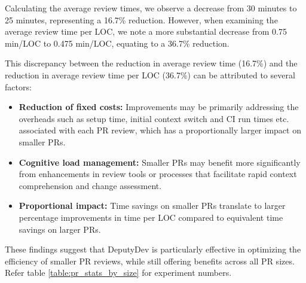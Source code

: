 Calculating the average review times, we observe a decrease from 30 minutes to 25 minutes, representing a 16.7\% reduction. However, when examining the average review time per LOC, we note a more substantial decrease from 0.75 min/LOC to 0.475 min/LOC, equating to a 36.7\% reduction.

This discrepancy between the reduction in average review time (16.7\%) and the reduction in average review time per LOC (36.7\%) can be attributed to several factors:

\begin{itemize}
    \item \textbf{Reduction of fixed costs:} Improvements may be primarily addressing the overheads such as setup time, initial context switch and CI run times etc. associated with each PR review, which has a proportionally larger impact on smaller PRs.
    \item \textbf{Cognitive load management:} Smaller PRs may benefit more significantly from enhancements in review tools or processes that facilitate rapid context comprehension and change assessment.
    \item \textbf{Proportional impact:} Time savings on smaller PRs translate to larger percentage improvements in time per LOC compared to equivalent time savings on larger PRs.
\end{itemize}

These findings suggest that DeputyDev is particularly effective in optimizing the efficiency of smaller PR reviews, while still offering benefits across all PR sizes. Refer table \ref{table:pr_stats_by_size} for experiment numbers.


% 

